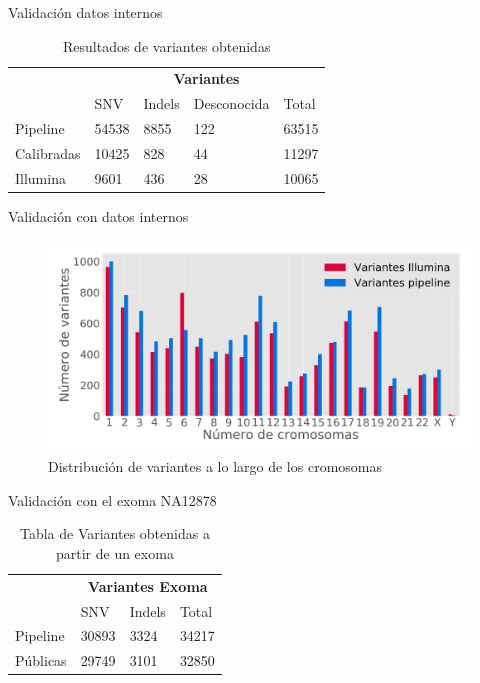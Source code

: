 \documentclass[xcolor=dvipsnames]{beamer}
\begin{document}
\begin{frame}{Validación datos internos}
\begin{table}[h!]
	\centering
	\footnotesize
	\begin{table}[]
		\begin{tabular}{l|l|l|l|l|}
			\cline{2-5}
			& \multicolumn{4}{c|}{\textbf{Variantes}} \\ \cline{2-5} 
			& SNV    & Indels  & Desconocida  & Total \\ \hline
			\multicolumn{1}{|l|}{Pipeline}   & 54538  & 8855    & 122          & 63515 \\ \hline
			\multicolumn{1}{|l|}{Calibradas} & 10425  & 828     & 44           & 11297 \\ \hline
			\multicolumn{1}{|l|}{Illumina}   & 9601   & 436     & 28           & 10065 \\ \hline
		\end{tabular}
	\end{table}
	\caption{Resultados de variantes obtenidas}
\end{table}
\end{frame}

\begin{frame}{Validación con datos internos}
	\begin{figure}[]
		\centering
		\includegraphics[width=1\textwidth]{validacion1}
		\caption{Distribución de variantes a lo largo de los cromosomas} \label{fig:distribucion}
	\end{figure}
\end{frame}

\begin{frame}{Validación con el exoma NA12878}
\begin{table}[H]
	\centering  
	\begin{tabular}{l|l|l|l|}
		\cline{2-4}
		& \multicolumn{3}{c|}{\textbf{Variantes Exoma}} \\ \cline{2-4} 
		& SNV           & Indels         & Total        \\ \hline
		\multicolumn{1}{|l|}{Pipeline} & 30893         & 3324           & 34217        \\ \hline
		\multicolumn{1}{|l|}{Públicas} & 29749         & 3101           & 32850        \\ \hline
	\end{tabular}
	\caption{Tabla de Variantes obtenidas a partir de un exoma}
	\label{tabla:tabla2}
\end{table} 
\end{frame}
\end{document}
